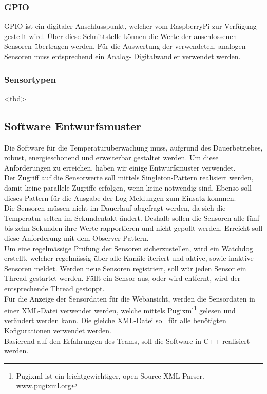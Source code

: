 \subsubsection{GPIO}
GPIO ist ein digitaler Anschlusspunkt, welcher vom RaspberryPi zur Verfügung gestellt wird. Über diese Schnittstelle können die Werte der anschlossenen Sensoren übertragen werden. Für die Auswertung der verwendeten, analogen Sensoren muss entsprechend ein Analog- Digitalwandler verwendet werden.

\subsubsection{Sensortypen}
<tbd>

\subsection{Software Entwurfsmuster}
Die Software für die Temperaturüberwachung muss, aufgrund des Dauerbetriebes, robust, energieschonend und erweiterbar gestaltet werden. Um diese Anforderungen zu erreichen, haben wir einige Entwurfsmuster verwendet.\\
Der Zugriff auf die Sensorwerte soll mittels Singleton-Pattern realisiert werden, damit keine parallele Zugriffe erfolgen, wenn keine notwendig sind. Ebenso soll dieses Pattern für die Ausgabe der Log-Meldungen zum Einsatz kommen.\\
Die Sensoren müssen nicht im Dauerlauf abgefragt werden, da sich die Temperatur selten im Sekundentakt ändert. Deshalb sollen die Sensoren alle fünf bis zehn Sekunden ihre Werte rapportieren und nicht gepollt werden. Erreicht soll diese Anforderung mit dem Observer-Pattern.\\
Um eine regelmässige Prüfung der Sensoren sicherzustellen, wird ein Watchdog erstellt, welcher regelmässig über alle Kanäle iteriert und aktive, sowie inaktive Sensoren meldet. Werden neue Sensoren registriert, soll wür jeden Sensor ein Thread gestartet werden. Fällt ein Sensor aus, oder wird entfernt, wird der entsprechende Thread gestoppt.\\
Für die Anzeige der Sensordaten für die Webansicht, werden die Sensordaten in einer XML-Datei verwendet werden, welche mittels Pugixml\footnote{Pugixml ist ein leichtgewichtiger, open Source XML-Parser. www.pugixml.org} gelesen und verändert werden kann. Die gleiche XML-Datei soll für alle benötigten Kofigurationen verwendet werden.\\
Basierend auf den Erfahrungen des Teams, soll die Software in C++ realisiert werden.
